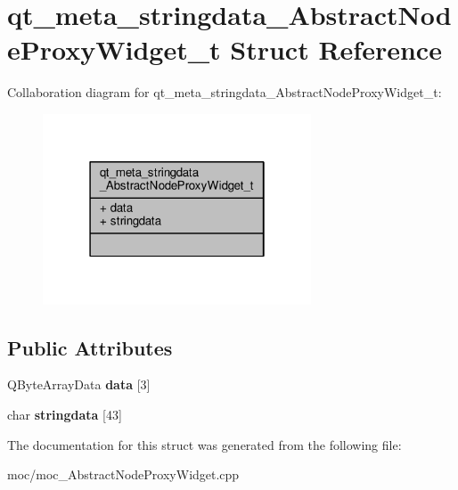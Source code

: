 \hypertarget{structqt__meta__stringdata___abstract_node_proxy_widget__t}{\section{qt\-\_\-meta\-\_\-stringdata\-\_\-\-Abstract\-Node\-Proxy\-Widget\-\_\-t Struct Reference}
\label{structqt__meta__stringdata___abstract_node_proxy_widget__t}
}


Collaboration diagram for qt\-\_\-meta\-\_\-stringdata\-\_\-\-Abstract\-Node\-Proxy\-Widget\-\_\-t\-:
\nopagebreak
\begin{figure}[H]
\begin{center}
\leavevmode
\includegraphics[width=226pt]{structqt__meta__stringdata___abstract_node_proxy_widget__t__coll__graph}
\end{center}
\end{figure}
\subsection*{Public Attributes}
\begin{DoxyCompactItemize}
\item 
\hypertarget{structqt__meta__stringdata___abstract_node_proxy_widget__t_ae8cfac0d296db61673355458d63778e2}{Q\-Byte\-Array\-Data {\bfseries data} \mbox{[}3\mbox{]}}\label{structqt__meta__stringdata___abstract_node_proxy_widget__t_ae8cfac0d296db61673355458d63778e2}

\item 
\hypertarget{structqt__meta__stringdata___abstract_node_proxy_widget__t_a12cdd731d19e7330d9cd3c8f9632ffeb}{char {\bfseries stringdata} \mbox{[}43\mbox{]}}\label{structqt__meta__stringdata___abstract_node_proxy_widget__t_a12cdd731d19e7330d9cd3c8f9632ffeb}

\end{DoxyCompactItemize}


The documentation for this struct was generated from the following file\-:\begin{DoxyCompactItemize}
\item 
moc/moc\-\_\-\-Abstract\-Node\-Proxy\-Widget.\-cpp\end{DoxyCompactItemize}
